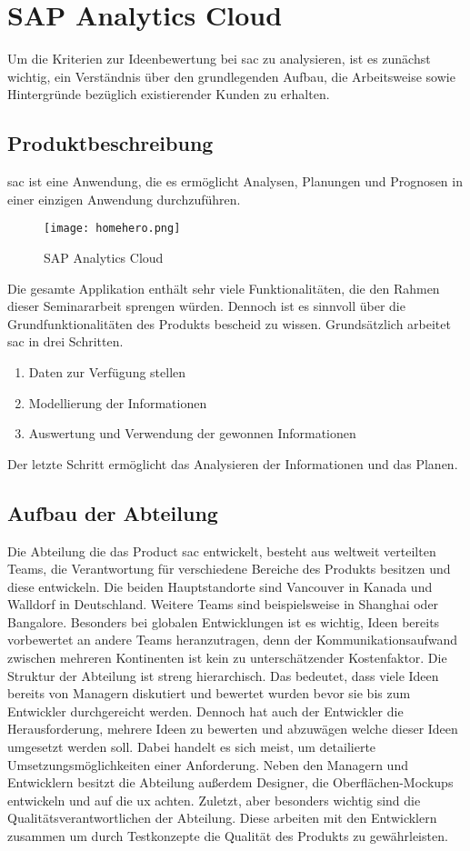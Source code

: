 \newpage
\section{SAP Analytics Cloud}\label{sec:sac}
Um die Kriterien zur Ideenbewertung bei \ac{sac} zu analysieren, ist es zunächst 
wichtig, ein Verständnis über den grundlegenden Aufbau, die Arbeitsweise sowie Hintergründe bezüglich 
existierender Kunden zu erhalten. 

\subsection{Produktbeschreibung}
\ac{sac} ist eine Anwendung, die es ermöglicht Analysen, Planungen und Prognosen in einer einzigen Anwendung durchzuführen. 
\begin{figure}[ht]
	\centering 
	\texttt{[image: homehero.png]}
	\caption{SAP Analytics Cloud}
	\label{img:homeHeroSAC}
\end{figure}
Die gesamte Applikation enthält sehr viele Funktionalitäten, die den Rahmen dieser Seminararbeit sprengen würden. Dennoch ist
es sinnvoll über die Grundfunktionalitäten des Produkts bescheid zu wissen. 
Grundsätzlich arbeitet \ac{sac} in drei Schritten. 

\begin{enumerate}
    \item Daten zur Verfügung stellen
    \item Modellierung der Informationen
    \item Auswertung und Verwendung der gewonnen Informationen 
\end{enumerate}
Der letzte Schritt ermöglicht das Analysieren der Informationen und das Planen. 

\subsection{Aufbau der Abteilung}
Die Abteilung die das Product \ac{sac} entwickelt, besteht aus weltweit verteilten Teams, 
die Verantwortung für verschiedene Bereiche des Produkts besitzen und diese entwickeln. 
Die beiden Hauptstandorte sind Vancouver in Kanada und Walldorf in Deutschland. Weitere Teams sind beispielsweise in 
Shanghai oder Bangalore. Besonders bei globalen Entwicklungen ist es wichtig, Ideen bereits vorbewertet an andere Teams 
heranzutragen, denn der Kommunikationsaufwand zwischen mehreren Kontinenten ist kein zu unterschätzender Kostenfaktor. 
Die Struktur der Abteilung ist streng hierarchisch. Das bedeutet, dass viele Ideen bereits von Managern diskutiert und 
bewertet wurden bevor sie bis zum Entwickler durchgereicht werden. Dennoch hat auch der Entwickler die Herausforderung, 
mehrere Ideen zu bewerten und abzuwägen welche dieser Ideen umgesetzt werden soll. Dabei handelt es sich meist, um detailierte Umsetzungsmöglichkeiten
einer Anforderung. 
Neben den Managern und Entwicklern besitzt die Abteilung außerdem Designer, die Oberflächen-Mockups entwickeln und auf
die \ac{ux} achten. Zuletzt, aber besonders wichtig sind die Qualitätsverantwortlichen der Abteilung. Diese 
arbeiten mit den Entwicklern zusammen um durch Testkonzepte die Qualität des Produkts zu gewährleisten.

